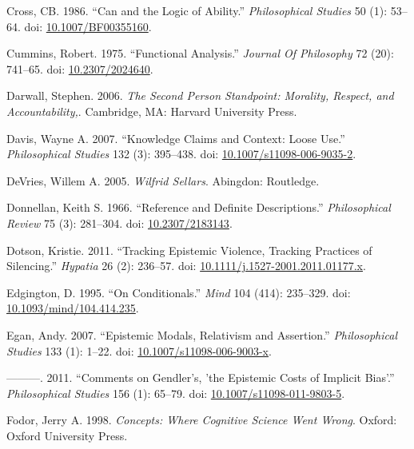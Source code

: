\documentclass[
  10pt,
  letterpaper,
  DIV=11,
  numbers=noendperiod,
  twoside]{scrartcl}
\newlength{\cslhangindent}
\newenvironment{CSLReferences}[2] %
 {\begin{list}{}{%
  \setlength{\itemindent}{0pt}
  \setlength{\leftmargin}{0pt}
  \setlength{\parsep}{0pt}
  \ifodd #1
   \setlength{\leftmargin}{\cslhangindent}
   \setlength{\itemindent}{-1\cslhangindent}
  \fi
  \setlength{\itemsep}{#2\baselineskip}}}
 {\end{list}}
\begin{document}
\begin{CSLReferences}{1}{0}
Cross, CB. 1986. {``Can and the Logic of Ability.''} \emph{Philosophical
Studies} 50 (1): 53--64. doi:
\href{https://doi.org/10.1007/BF00355160}{10.1007/BF00355160}.

Cummins, Robert. 1975. {``Functional Analysis.''} \emph{Journal Of
Philosophy} 72 (20): 741--65. doi:
\href{https://doi.org/10.2307/2024640}{10.2307/2024640}.

Darwall, Stephen. 2006. \emph{The Second Person Standpoint: Morality,
Respect, and Accountability,}. Cambridge, MA: Harvard University Press.

Davis, Wayne A. 2007. {``Knowledge Claims and Context: Loose Use.''}
\emph{Philosophical Studies} 132 (3): 395--438. doi:
\href{https://doi.org/10.1007/s11098-006-9035-2}{10.1007/s11098-006-9035-2}.

DeVries, Willem A. 2005. \emph{Wilfrid Sellars}. Abingdon: Routledge.

Donnellan, Keith S. 1966. {``Reference and Definite Descriptions.''}
\emph{Philosophical Review} 75 (3): 281--304. doi:
\href{https://doi.org/10.2307/2183143}{10.2307/2183143}.

Dotson, Kristie. 2011. {``Tracking Epistemic Violence, Tracking
Practices of Silencing.''} \emph{Hypatia} 26 (2): 236--57. doi:
\href{https://doi.org/10.1111/j.1527-2001.2011.01177.x}{10.1111/j.1527-2001.2011.01177.x}.

Edgington, D. 1995. {``On Conditionals.''} \emph{Mind} 104 (414):
235--329. doi:
\href{https://doi.org/10.1093/mind/104.414.235}{10.1093/mind/104.414.235}.

Egan, Andy. 2007. {``Epistemic Modals, Relativism and Assertion.''}
\emph{Philosophical Studies} 133 (1): 1--22. doi:
\href{https://doi.org/10.1007/s11098-006-9003-x}{10.1007/s11098-006-9003-x}.

---------. 2011. {``Comments on Gendler's, 'the Epistemic Costs of
Implicit Bias'.''} \emph{Philosophical Studies} 156 (1): 65--79. doi:
\href{https://doi.org/10.1007/s11098-011-9803-5}{10.1007/s11098-011-9803-5}.

Fodor, Jerry A. 1998. \emph{Concepts: Where Cognitive Science Went
Wrong}. Oxford: Oxford University Press.


\end{CSLReferences}
\end{document}
